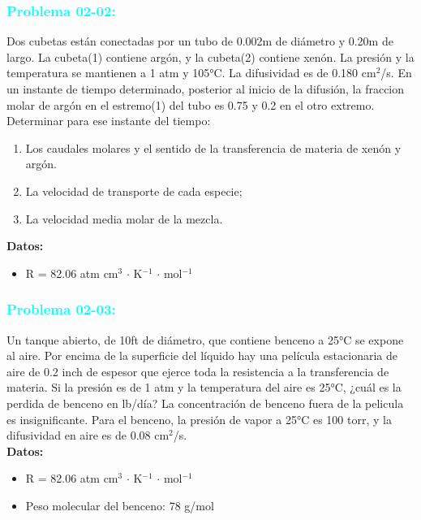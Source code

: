 \documentclass{report}
\begin{document}
\subsubsection{\textbf{\textcolor{cyan}{Problema 02-02:}}}
\begin{raggedright}
	Dos cubetas están conectadas por un tubo de 0.002m de diámetro y 0.20m de largo. La cubeta(1) contiene argón, y la cubeta(2)
	contiene xenón. La presión y la temperatura se mantienen a 1 atm y 105°C. La difusividad es de 0.180 cm$^2$/s. En un instante de tiempo determinado, posterior al inicio de la difusión, la fraccion molar de argón en el estremo(1)
	del tubo es 0.75 y 0.2 en el otro extremo. Determinar para ese instante del tiempo:
	\begin{enumerate}[label=\textbf{\alph*)}]
		\item Los caudales molares y el sentido de la transferencia de materia de xenón y argón.
		\item La velocidad de transporte de cada especie;
		\item La velocidad media molar de la mezcla.
	\end{enumerate}
	\textbf{Datos:}
	\begin{itemize}
		\item [] R = 82.06 atm cm$^3$ $\cdot$ K$^{-1}$ $\cdot$ mol$^{-1}$
	\end{itemize}
\end{raggedright}

\subsubsection{\textbf{\textcolor{cyan}{Problema 02-03:}}}
\begin{raggedright}
	Un tanque abierto, de 10ft de diámetro, que contiene benceno a 25°C se expone al aire. Por encima de la superficie
	del líquido hay una película estacionaria de aire de 0.2 inch de espesor que ejerce toda la resistencia a la transferencia de materia.
	Si la presión es de 1 atm y la temperatura del aire es 25°C, ¿cuál es la perdida de benceno en lb/día? La concentración de benceno fuera de la pelicula es insignificante.
	Para el benceno, la presión de vapor a 25°C es 100 torr, y la difusividad en aire es de 0.08 cm$^2$/s.\\
	\textbf{Datos:}
	\begin{itemize}
		\item [] R = 82.06 atm cm$^3$ $\cdot$ K$^{-1}$ $\cdot$ mol$^{-1}$
		\item [] Peso molecular del benceno: 78 g/mol
	\end{itemize}
\end{raggedright}
\end{document}
